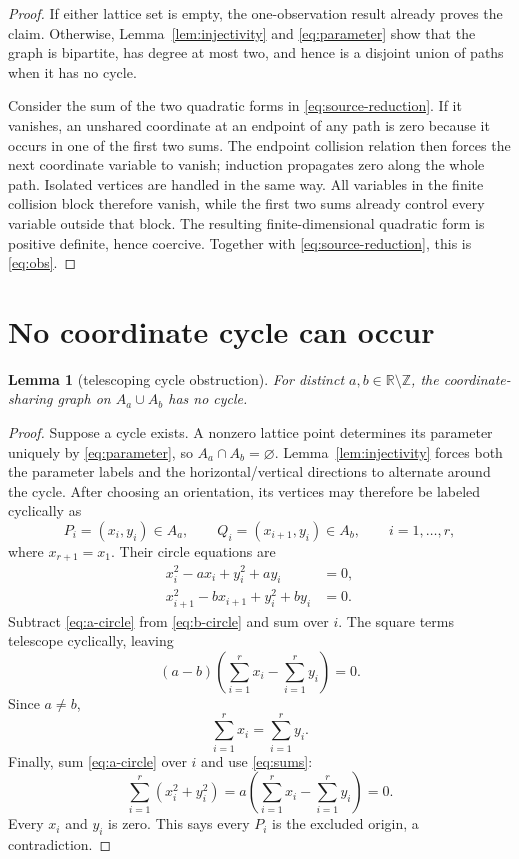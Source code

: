 \documentclass[11pt]{article}
\newtheorem{lemma}{Lemma}
\newcommand{\Z}{\mathbb Z}
\newcommand{\R}{\mathbb R}
\begin{document}
\begin{proof}
If either lattice set is empty, the one-observation result
\cite[Theorem~4.4(ii)]{JK} already proves the claim.  Otherwise,
Lemma~\ref{lem:injectivity} and \eqref{eq:parameter} show that the graph is
bipartite, has degree at most two, and hence is a disjoint union of paths when
it has no cycle.

Consider the sum of the two quadratic forms in
\eqref{eq:source-reduction}.  If it vanishes, an unshared coordinate at an
endpoint of any path is zero because it occurs in one of the first two sums.
The endpoint collision relation then forces the next coordinate variable to
vanish; induction propagates zero along the whole path.  Isolated vertices
are handled in the same way.  All variables in the finite collision block
therefore vanish, while the first two sums already control every variable
outside that block.  The resulting finite-dimensional quadratic form is
positive definite, hence coercive.  Together with
\eqref{eq:source-reduction}, this is \eqref{eq:obs}.
\end{proof}

\section{No coordinate cycle can occur}

\begin{lemma}[telescoping cycle obstruction]\label{lem:no-cycle}
For distinct $a,b\in\R\setminus\Z$, the coordinate-sharing graph on
$A_a\cup A_b$ has no cycle.
\end{lemma}

\begin{proof}
Suppose a cycle exists.  A nonzero lattice point determines its parameter
uniquely by \eqref{eq:parameter}, so $A_a\cap A_b=\varnothing$.
Lemma~\ref{lem:injectivity} forces both the parameter labels and the
horizontal/vertical directions to alternate around the cycle.  After choosing
an orientation, its vertices may therefore be labeled cyclically as
\[
 P_i=(x_i,y_i)\in A_a,
 \qquad Q_i=(x_{i+1},y_i)\in A_b,
 \qquad i=1,\ldots,r,
\]
where $x_{r+1}=x_1$.  Their circle equations are
\begin{align}
 x_i^2-a x_i+y_i^2+a y_i&=0, \label{eq:a-circle}\\
 x_{i+1}^2-b x_{i+1}+y_i^2+b y_i&=0. \label{eq:b-circle}
\end{align}
Subtract \eqref{eq:a-circle} from \eqref{eq:b-circle} and sum over $i$.
The square terms telescope cyclically, leaving
\[
 (a-b)\left(\sum_{i=1}^r x_i-\sum_{i=1}^r y_i\right)=0.
\]
Since $a\ne b$,
\begin{equation}\label{eq:sums}
 \sum_{i=1}^r x_i=\sum_{i=1}^r y_i.
\end{equation}
Finally, sum \eqref{eq:a-circle} over $i$ and use \eqref{eq:sums}:
\[
 \sum_{i=1}^r(x_i^2+y_i^2)
 =a\left(\sum_{i=1}^r x_i-\sum_{i=1}^r y_i\right)=0.
\]
Every $x_i$ and $y_i$ is zero.  This says every $P_i$ is the excluded origin,
a contradiction.
\end{proof}
\end{document}
